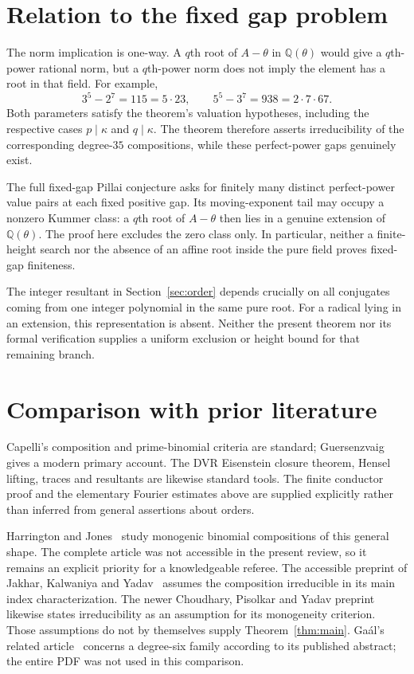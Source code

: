 \documentclass[11pt,letterpaper]{article}
\theoremstyle{remark}\newtheorem{remark}[theorem]{Remark}
\newcommand{\Q}{\mathbb Q}
\begin{document}
\section{Relation to the fixed gap problem}

The norm implication is one-way. A $q$th root of $A-\theta$ in
$\Q(\theta)$ would give a $q$th-power rational norm, but a $q$th-power norm
does not imply the element has a root in that field. For example,
\[
              3^5-2^7=115=5\cdot23,
       \qquad 5^5-3^7=938=2\cdot7\cdot67.
\]
Both parameters satisfy the theorem's valuation hypotheses, including the
respective cases $p\mid\kappa$ and $q\mid\kappa$. The theorem therefore
asserts irreducibility of the corresponding degree-$35$ compositions,
while these perfect-power gaps genuinely exist.

The full fixed-gap Pillai conjecture asks for finitely many distinct
perfect-power value pairs at each fixed positive gap. Its moving-exponent
tail may occupy a nonzero Kummer class: a $q$th root of $A-\theta$ then lies
in a genuine extension of $\Q(\theta)$. The proof here excludes the zero
class only. In particular, neither a finite-height search nor the absence
of an affine root inside the pure field proves fixed-gap finiteness.

The integer resultant in Section~\ref{sec:order} depends crucially on
all conjugates coming from one integer polynomial in the same pure root.
For a radical lying in an extension, this representation is absent.
Neither the present theorem nor its formal verification supplies a
uniform exclusion or height bound for that remaining branch.

\section{Comparison with prior literature}\label{sec:prior}

Capelli's composition and prime-binomial criteria are standard;
Guersenzvaig~\cite{Guersenzvaig} gives a modern primary account.
The DVR Eisenstein closure theorem, Hensel lifting, traces and resultants
are likewise standard tools. The finite conductor proof and the elementary
Fourier estimates above are supplied explicitly rather than inferred from
general assertions about orders.

Harrington and Jones~\cite{HJ} study monogenic binomial compositions of
this general shape. The complete article was not accessible in the present
review, so it remains an explicit priority for a knowledgeable referee.
The accessible preprint of Jakhar, Kalwaniya and Yadav~\cite{JKY} assumes
the composition irreducible in its main index characterization. The newer
Choudhary, Pisolkar and Yadav preprint~\cite{CPY} likewise states
irreducibility as an assumption for its monogeneity criterion. Those
assumptions do not by themselves supply Theorem~\ref{thm:main}.
Ga\'al's related article~\cite{Gaal} concerns a degree-six family according
to its published abstract; the entire PDF was not used in this comparison.
\end{document}
